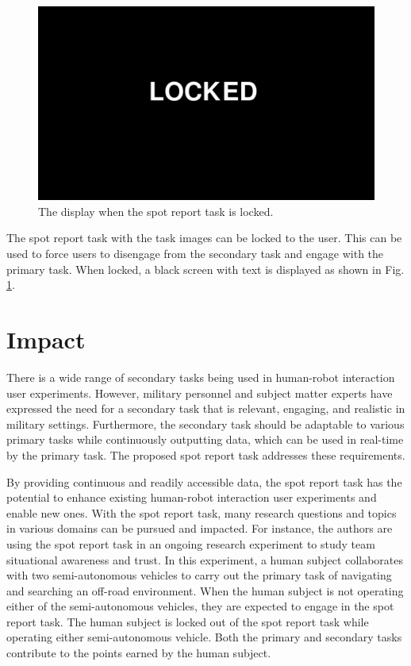 \documentclass[preprint,12pt, a4paper]{elsarticle}
\begin{document}
\begin{figure}[h!]
    \centering
    \includegraphics[scale=0.5]{Figures/locked.jpg}
    \caption{The display when the spot report task is locked.}
    \label{fig:locked}
\end{figure}


The spot report task with the task images can be locked to the user. This can be used to force users to disengage from the secondary task and engage with the primary task. When locked, a black screen with text is displayed as shown in Fig. \ref{fig:locked}.


\section{Impact}
There is a wide range of secondary tasks being used in human-robot interaction user experiments. However, military personnel and subject matter experts have expressed the need for a secondary task that is relevant, engaging, and realistic in military settings. Furthermore, the secondary task should be adaptable to various primary tasks while continuously outputting data, which can be used in real-time by the primary task. The proposed spot report task addresses these requirements. \vspace{2mm}

By providing continuous and readily accessible data, the spot report task has the potential to enhance existing human-robot interaction user experiments and enable new ones. With the spot report task, many research questions and topics in various domains can be pursued and impacted. For instance, the authors are using the spot report task in an ongoing research experiment to study team situational awareness and trust. In this experiment, a human subject collaborates with two semi-autonomous vehicles to carry out the primary task of navigating and searching an off-road environment. When the human subject is not operating either of the semi-autonomous vehicles, they are expected to engage in the spot report task. The human subject is locked out of the spot report task while operating either semi-autonomous vehicle. Both the primary and secondary tasks contribute to the points earned by the human subject.
\end{document}
